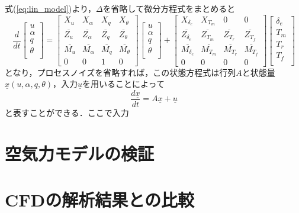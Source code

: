 式(\ref{eq:lin_model})より，$\Delta$を省略して微分方程式をまとめると
\begin{equation}
  \dfrac{d}{dt}
  \left[
  \begin{array}{cccc}
    u \\
    \alpha \\
    q \\
    \theta \\
  \end{array}
  \right] =
  \left[
  \begin{array}{cccc}
    X_u & X_\alpha & X_q & X_\theta \\
    \overline{Z_u} & \overline{Z_\alpha} & \overline{Z_q} & \overline{Z_\theta} \\
    \overline{M_u} & \overline{M_\alpha} & \overline{M_q} & \overline{M_\theta} \\
    0 & 0 & 1 & 0
  \end{array}
  \right]
  \left[
  \begin{array}{cccc}
    u \\
    \alpha \\
    q \\
    \theta \\
  \end{array}
  \right] +
  \left[
  \begin{array}{cccc}
    X_{\delta_e} & X_{T_m} & 0 & 0 \\
    \overline{Z_{\delta_e}} & \overline{Z_{T_m}} & \overline{Z_{T_r}} & \overline{Z_{T_f}} \\
    \overline{M_{\delta_e}} & \overline{M_{T_m}} & \overline{M_{T_r}} & \overline{M_{T_f}} \\
    0 & 0 & 0 & 0
  \end{array}
  \right]
  \left[
  \begin{array}{cccc}
    \delta_e \\
    T_m \\
    T_r \\
    T_f \\
  \end{array}
  \right]
\end{equation}
となり，プロセスノイズを省略すれば，この状態方程式は行列$A$と状態量$\underline{x}(u,\alpha,q,\theta)$，入力$\underline{u}$を用いることによって
\begin{equation}
  \dfrac{d\underline{x}}{dt} = A\underline{x} + \underline{u}
\end{equation}
と表すことができる．ここで入力

\section{空気力モデルの検証}

\section{CFDの解析結果との比較}
